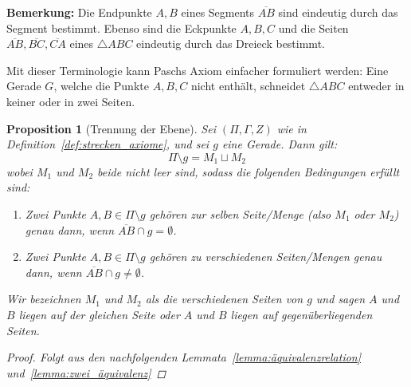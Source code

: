 \documentclass[a4paper,12pt]{article}
\theoremstyle{break}
\newtheorem{proposition}[definition]{Proposition}
\begin{document}
\textbf{Bemerkung:} Die Endpunkte \(A, B\) eines Segments \(\overline{AB}\) sind eindeutig durch das Segment bestimmt. Ebenso sind die Eckpunkte \(A, B, C\) und die Seiten \(\overline{AB}, \overline{BC}, \overline{CA}\) eines \(\triangle ABC\) eindeutig durch das Dreieck bestimmt. 

Mit dieser Terminologie kann Paschs Axiom einfacher formuliert werden: Eine Gerade \(G\), welche die Punkte \(A, B, C\) nicht enthält, schneidet \(\triangle ABC\) entweder in keiner oder in zwei Seiten.

\begin{proposition}[Trennung der Ebene]\label{prop:trennung_der_ebene}
Sei \((\Pi, \Gamma, Z)\) wie in Definition~\ref{def:strecken_axiome}, und sei \(g\) eine Gerade. Dann gilt:
\[
\Pi \setminus g = M_1 \sqcup M_2
\]
wobei \(M_1\) und \(M_2\) beide nicht leer sind, sodass die folgenden Bedingungen erfüllt sind:
\begin{enumerate}
    \item Zwei Punkte \(A, B \in \Pi \setminus g\) gehören zur selben Seite/Menge (also \(M_1\) oder \(M_2\)) genau dann, wenn \(\overline{AB} \cap g = \emptyset\).
    \item Zwei Punkte \(A, B \in \Pi \setminus g\) gehören zu verschiedenen Seiten/Mengen genau dann, wenn \(\overline{AB} \cap g \neq \emptyset\).
\end{enumerate}
Wir bezeichnen \(M_1\) und \(M_2\) als die verschiedenen Seiten von \(g\) und sagen \glqq\(A\) und \(B\) liegen auf der gleichen Seite\grqq{} oder \glqq\(A\) und \(B\) liegen auf gegenüberliegenden Seiten\grqq{}.
\begin{proof}
    Folgt aus den nachfolgenden Lemmata~\ref{lemma:äquivalenzrelation} und~\ref{lemma:zwei_äquivalenz}
\end{proof}
\end{proposition}
\end{document}
